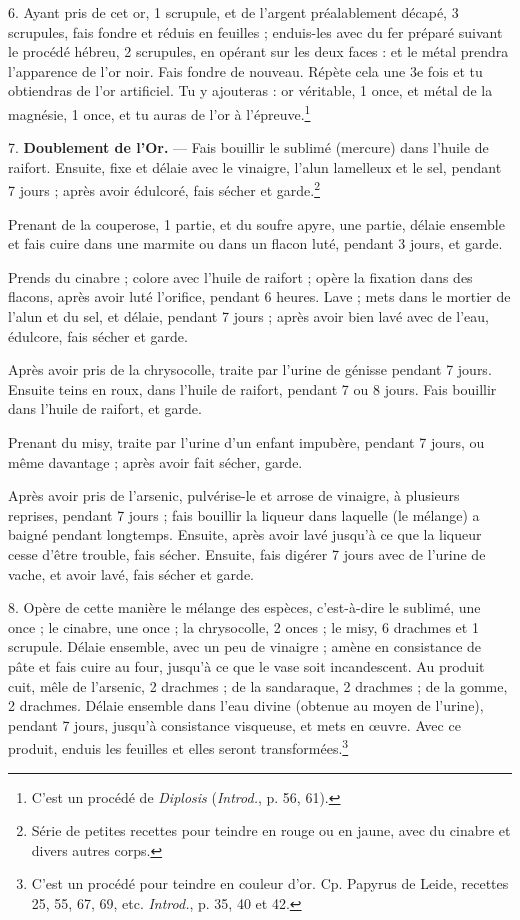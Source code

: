 \documentclass[a4paper, 11pt, oneside, polutonikogreek, french]{article}
\begin{document}
6. Ayant pris de cet or, 1 scrupule, et de l'argent préalablement décapé, 3 scrupules, fais fondre et réduis en feuilles ; enduis-les avec du fer préparé suivant le procédé hébreu, 2 scrupules, en opérant sur les deux faces : et le métal prendra l'apparence de l'or noir. Fais fondre de nouveau. Répète cela une 3e fois et tu obtiendras de l'or artificiel. Tu y ajouteras : or véritable, 1 once, et métal de la magnésie, 1 once, et tu auras de l'or à l'épreuve.\footnote{C'est un procédé de \emph{Diplosis} (\emph{Introd.}, p. 56, 61).}

7. \textbf{Doublement de l'Or.} --- Fais bouillir le sublimé (mercure) dans l'huile de raifort. Ensuite, fixe et délaie avec le vinaigre, l'alun lamelleux et le sel, pendant 7 jours ; après avoir édulcoré, fais sécher et garde.\footnote{Série de petites recettes pour teindre en rouge ou en jaune, avec du cinabre et divers autres corps.}

Prenant de la couperose, 1 partie, et du soufre apyre, une partie, délaie ensemble et fais cuire dans une marmite ou dans un flacon luté, pendant 3 jours, et garde.

Prends du cinabre ; colore avec l'huile de raifort ; opère la fixation dans des flacons, après avoir luté l'orifice, pendant 6 heures. Lave ; mets dans le mortier de l'alun et du sel, et délaie, pendant 7 jours ; après avoir bien lavé avec de l'eau, édulcore, fais sécher et garde.

Après avoir pris de la chrysocolle, traite par l'urine de génisse pendant 7 jours. Ensuite teins en roux, dans l'huile de raifort, pendant 7 ou 8 jours. Fais bouillir dans l'huile de raifort, et garde.

Prenant du misy, traite par l'urine d'un enfant impubère, pendant 7 jours, ou même davantage ; après avoir fait sécher, garde.

Après avoir pris de l'arsenic, pulvérise-le et arrose de vinaigre, à plusieurs reprises, pendant 7 jours ; fais bouillir la liqueur dans laquelle (le mélange) a baigné pendant longtemps. Ensuite, après avoir lavé jusqu'à ce que la liqueur cesse d'être trouble, fais sécher. Ensuite, fais digérer 7 jours avec de l'urine de vache, et avoir lavé, fais sécher et garde.

8. Opère de cette manière le mélange des espèces, c'est-à-dire le sublimé, une once ; le cinabre, une once ; la chrysocolle, 2 onces ; le misy, 6 drachmes et 1 scrupule. Délaie ensemble, avec un peu de vinaigre ; amène en consistance de pâte et fais cuire au four, jusqu'à ce que le vase soit incandescent. Au produit cuit, mêle de l'arsenic, 2 drachmes ; de la sandaraque, 2 drachmes ; de la gomme, 2 drachmes. Délaie ensemble dans l'eau divine (obtenue au moyen de l'urine), pendant 7 jours, jusqu'à consistance visqueuse, et mets en œuvre. Avec ce produit, enduis les feuilles et elles seront transformées.\footnote{C'est un procédé pour teindre en couleur d'or. Cp. Papyrus de Leide, recettes 25, 55, 67, 69, etc. \emph{Introd.}, p. 35, 40 et 42.}
\end{document}
